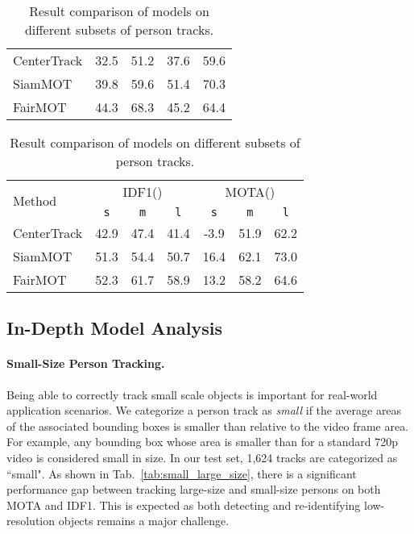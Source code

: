 \documentclass[runningheads]{llncs}
\begin{document}
\begin{table}[t]
\begin{minipage}[t]{0.45\textwidth}
\begin{tabular}{lcccc}
        CenterTrack  & 32.5  & 51.2  & 37.6  & 59.6 \\
        SiamMOT  & 39.8  & 59.6  & 51.4  & 70.3 \\
        FairMOT  & 44.3  & 68.3  & 45.2  & 64.4 \\
        \bottomrule
    \end{tabular}
\label{tab:long_occluded}
\end{minipage}
\hfill
\begin{minipage}[t]{0.5\textwidth}
    \small
    \centering
    \begin{tabular}{lcccccc}
        \toprule
        \multirow{2}{*}{Method}  & \multicolumn{3}{c}{IDF1()} & \multicolumn{3}{c}{MOTA()}  \\
                 & \texttt{s} & \texttt{m} & \texttt{l} & \texttt{s} & \texttt{m} & \texttt{l} \\
        \midrule


        CenterTrack  & 42.9  & 47.4  & 41.4  & -3.9  & 51.9  & 62.2 \\
        SiamMOT  & 51.3  & 54.4  & 50.7  & 16.4  & 62.1  & 73.0 \\
        FairMOT  & 52.3  & 61.7  & 58.9  & 13.2  & 58.2  & 64.6 \\
        \bottomrule
    \end{tabular}
    \label{tab:track_duration}
\end{minipage}
\caption{\small Result comparison of models on different subsets of person tracks.}
\end{table}
\subsection{In-Depth Model Analysis}
\paragraph{\textbf{Small-Size Person Tracking.}}
Being able to correctly track small scale objects is important for real-world application scenarios. We categorize a person track as \textit{small} if the average areas of the associated bounding boxes is smaller than  relative to the video frame area. 
For example, any bounding box whose area is smaller than  for a standard 720p video is considered small in size. In our test set, 1,624 tracks are categorized as ``small".
As shown in Tab.~\ref{tab:small_large_size}, there is a significant performance gap between tracking large-size and small-size persons on both MOTA and IDF1. This is expected as both detecting and re-identifying low-resolution objects remains a major challenge. 
\end{document}
